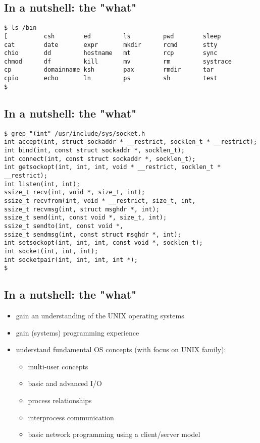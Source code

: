 \documentclass[xga]{xdvislides}
\begin{document}
%

\subsection{In a nutshell: the "what"}
\begin{verbatim}
$ ls /bin
[          csh        ed         ls         pwd        sleep
cat        date       expr       mkdir      rcmd       stty
chio       dd         hostname   mt         rcp        sync
chmod      df         kill       mv         rm         systrace
cp         domainname ksh        pax        rmdir      tar
cpio       echo       ln         ps         sh         test
$
\end{verbatim}

\subsection{In a nutshell: the "what"}
\begin{verbatim}
$ grep "(int" /usr/include/sys/socket.h
int	accept(int, struct sockaddr * __restrict, socklen_t * __restrict);
int	bind(int, const struct sockaddr *, socklen_t);
int	connect(int, const struct sockaddr *, socklen_t);
int	getsockopt(int, int, int, void * __restrict, socklen_t * __restrict);
int	listen(int, int);
ssize_t	recv(int, void *, size_t, int);
ssize_t	recvfrom(int, void * __restrict, size_t, int,
ssize_t	recvmsg(int, struct msghdr *, int);
ssize_t	send(int, const void *, size_t, int);
ssize_t	sendto(int, const void *,
ssize_t	sendmsg(int, const struct msghdr *, int);
int	setsockopt(int, int, int, const void *, socklen_t);
int	socket(int, int, int);
int	socketpair(int, int, int, int *);
$
\end{verbatim}

\subsection{In a nutshell: the "what"}
\begin{itemize}
	\item gain an understanding of the UNIX operating systems
	\item gain (systems) programming experience
	\item understand fundamental OS concepts (with focus on UNIX family):
		\begin{itemize}
			\item multi-user concepts
			\item basic and advanced I/O
			\item process relationships
			\item interprocess communication
			\item basic network programming using a client/server model
		\end{itemize}
\end{itemize}
\end{document}
